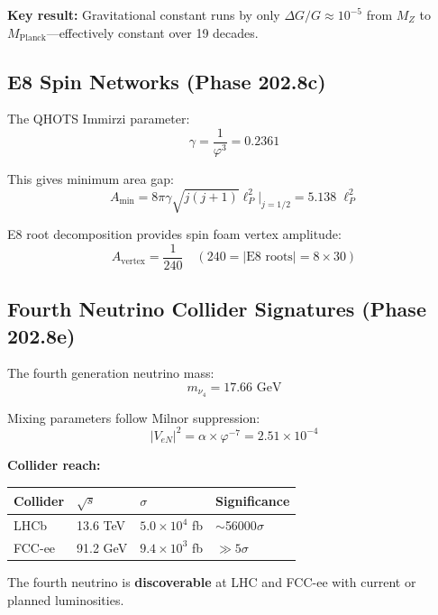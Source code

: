 \documentclass[aps,prd,twocolumn,superscriptaddress,floatfix,nofootinbib]{revtex4-2}
\theoremstyle{definition}
\theoremstyle{remark}
\newcommand{\vp}{\varphi}
\begin{document}
\textbf{Key result:} Gravitational constant runs by only $\Delta G/G \approx 10^{-5}$ from $M_Z$ to $M_{\text{Planck}}$---effectively constant over 19 decades.

\subsection{E8 Spin Networks (Phase 202.8c)}

The QHOTS Immirzi parameter:
\begin{equation}
\gamma = \frac{1}{\vp^3} = 0.2361
\end{equation}

This gives minimum area gap:
\begin{equation}
A_{\min} = 8\pi\gamma \sqrt{j(j+1)} \ell_P^2 \big|_{j=1/2} = 5.138\; \ell_P^2
\end{equation}

E8 root decomposition provides spin foam vertex amplitude:
\begin{equation}
A_{\text{vertex}} = \frac{1}{240} \quad (240 = |\text{E8 roots}| = 8 \times 30)
\end{equation}

\subsection{Fourth Neutrino Collider Signatures (Phase 202.8e)}

The fourth generation neutrino mass:
\begin{equation}
\boxed{m_{\nu_4} = 17.66\text{ GeV}}
\end{equation}

Mixing parameters follow Milnor suppression:
\begin{equation}
|V_{eN}|^2 = \alpha \times \vp^{-7} = 2.51 \times 10^{-4}
\end{equation}

\textbf{Collider reach:}
\begin{center}
\small
\begin{tabular}{llll}
\toprule
Collider & $\sqrt{s}$ & $\sigma$ & Significance \\
\midrule
LHCb & 13.6 TeV & $5.0\times10^4$ fb & $\sim$56000$\sigma$ \\
FCC-ee & 91.2 GeV & $9.4\times10^3$ fb & $\gg 5\sigma$ \\
\bottomrule
\end{tabular}
\end{center}

The fourth neutrino is \textbf{discoverable} at LHC and FCC-ee with current or planned luminosities.
\end{document}
